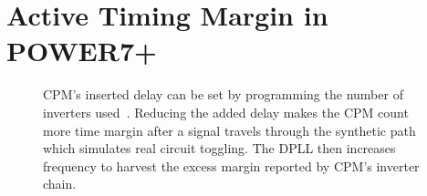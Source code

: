 \section{Active Timing Margin in POWER7+}
\label{sec:process:setup}

\begin{figure}[t]

    \caption{CPM's inserted delay can be set by programming the number of inverters used~\cite{drake2007distributed, drake2013single}. Reducing the added delay makes the CPM count more time margin after a signal travels through the synthetic path which simulates real circuit toggling. The DPLL then increases frequency to harvest the excess margin reported by CPM's inverter chain.}
\end{figure}

